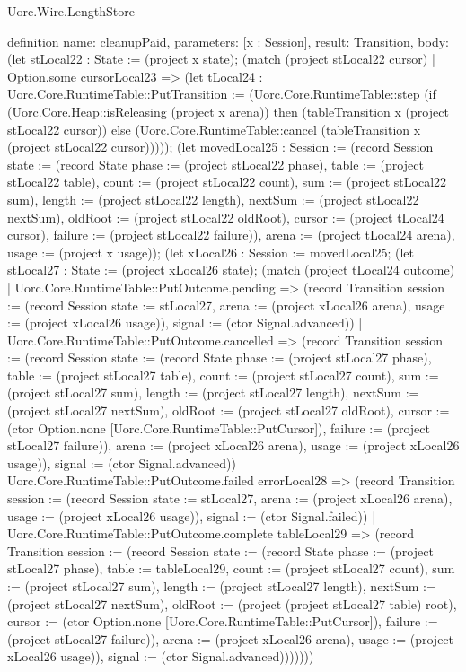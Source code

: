 \begin{lexlean}{Uorc.Wire.LengthStore}
\begin{semanticmodule}
definition{
  name: cleanupPaid,
  parameters: [x : Session],
  result: Transition,
  body: (let stLocal22 : State := (project x state); (match (project stLocal22 cursor)
    | Option.some cursorLocal23 => (let tLocal24 : Uorc.Core.RuntimeTable::PutTransition := (Uorc.Core.RuntimeTable::step (if (Uorc.Core.Heap::isReleasing (project x arena)) then (tableTransition x (project stLocal22 cursor)) else (Uorc.Core.RuntimeTable::cancel (tableTransition x (project stLocal22 cursor))))); (let movedLocal25 : Session := (record Session {state := (record State {phase := (project stLocal22 phase), table := (project stLocal22 table), count := (project stLocal22 count), sum := (project stLocal22 sum), length := (project stLocal22 length), nextSum := (project stLocal22 nextSum), oldRoot := (project stLocal22 oldRoot), cursor := (project tLocal24 cursor), failure := (project stLocal22 failure)}), arena := (project tLocal24 arena), usage := (project x usage)}); (let xLocal26 : Session := movedLocal25; (let stLocal27 : State := (project xLocal26 state); (match (project tLocal24 outcome)
      | Uorc.Core.RuntimeTable::PutOutcome.pending => (record Transition {session := (record Session {state := stLocal27, arena := (project xLocal26 arena), usage := (project xLocal26 usage)}), signal := (ctor Signal.advanced)})
      | Uorc.Core.RuntimeTable::PutOutcome.cancelled => (record Transition {session := (record Session {state := (record State {phase := (project stLocal27 phase), table := (project stLocal27 table), count := (project stLocal27 count), sum := (project stLocal27 sum), length := (project stLocal27 length), nextSum := (project stLocal27 nextSum), oldRoot := (project stLocal27 oldRoot), cursor := (ctor Option.none [Uorc.Core.RuntimeTable::PutCursor]), failure := (project stLocal27 failure)}), arena := (project xLocal26 arena), usage := (project xLocal26 usage)}), signal := (ctor Signal.advanced)})
      | Uorc.Core.RuntimeTable::PutOutcome.failed errorLocal28 => (record Transition {session := (record Session {state := stLocal27, arena := (project xLocal26 arena), usage := (project xLocal26 usage)}), signal := (ctor Signal.failed)})
      | Uorc.Core.RuntimeTable::PutOutcome.complete tableLocal29 => (record Transition {session := (record Session {state := (record State {phase := (project stLocal27 phase), table := tableLocal29, count := (project stLocal27 count), sum := (project stLocal27 sum), length := (project stLocal27 length), nextSum := (project stLocal27 nextSum), oldRoot := (project (project stLocal27 table) root), cursor := (ctor Option.none [Uorc.Core.RuntimeTable::PutCursor]), failure := (project stLocal27 failure)}), arena := (project xLocal26 arena), usage := (project xLocal26 usage)}), signal := (ctor Signal.advanced)}))))))
}
\end{semanticmodule}
\end{lexlean}
